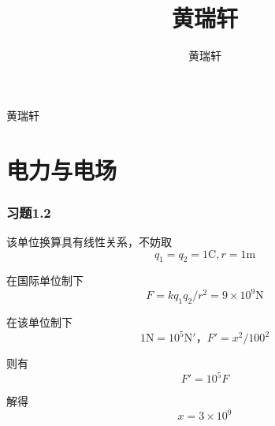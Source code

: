 \documentclass{SCIS2020cn}
\begin{document}
\DOI{}
\ReceiveDate{}
\ReviseDate{}
\AcceptDate{}
\OnlineDate{}

\title{黄瑞轩}{黄瑞轩}


\author[]{黄瑞轩}{}


\address[1]{ }



\AuthorCitation{ }
\enAuthorCitation{ }


\maketitle
\newpage

\part{电力与电场}

\section{习题1.2}
该单位换算具有线性关系，不妨取
\begin{equation}
    q_1=q_2=1\text{C},r=1\text{m}
\end{equation}

在国际单位制下
\begin{equation}
    F=kq_1q_2/r^2=9×10^9\text{N}
\end{equation}

在该单位制下
\begin{equation}
    1\text{N}=10^5\text{N}'\text{，}F'=x^2/100^2
\end{equation}

则有
\begin{equation}
    F'=10^5F
\end{equation}

解得
\begin{equation}
    x=3×10^9
\end{equation}
\end{document}
